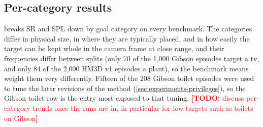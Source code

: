 \documentclass[10pt]{article}
\newcommand{\TODO}[1]{\textcolor{red}{\textbf{[TODO:} #1\textbf{]}}}
\newcommand{\SR}{\textsc{SR}\xspace}
\newcommand{\SPL}{\textsc{SPL}\xspace}
\begin{document}
\subsection{Per-category results}\label{app:additional-category}

 breaks \SR and \SPL down by goal category on every benchmark. The categories differ in physical size, in where they are typically placed, and in how easily the target can be kept whole in the camera frame at close range, and their frequencies differ between splits (only 70 of the 1{,}000 Gibson episodes target a tv, and only 84 of the 2{,}000 HM3D v1 episodes a plant), so the benchmark means weight them very differently. Fifteen of the 208 Gibson toilet episodes were used to tune the later revisions of the method (\cref{sec:experiments-privileges}), so the Gibson toilet row is the entry most exposed to that tuning. \TODO{discuss per-category trends once the runs are in, in particular for low targets such as toilets on Gibson}
\end{document}
